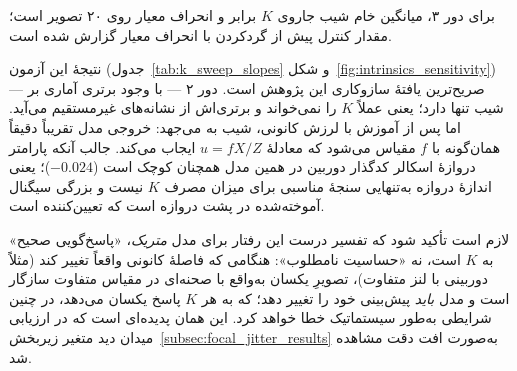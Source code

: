 برای دور ۳، میانگین خام شیب جاروی $K$ برابر  و انحراف معیار
 روی ۲۰ تصویر است؛ مقدار کنترل پیش از گردکردن
 با انحراف معیار  گزارش شده است.

نتیجهٔ این آزمون (جدول~\ref{tab:k_sweep_slopes} و شکل~\ref{fig:intrinsics_sensitivity}) صریح‌ترین یافتهٔ سازوکاری این پژوهش است. \proposedmodel{} دور ۲ --- با وجود برتری آماری بر \controlmodel{} --- شیب تنها  دارد؛ یعنی عملاً $K$ را نمی‌خواند و برتری‌اش از نشانه‌های غیرمستقیم می‌آید. اما پس از آموزش با لرزش کانونی، شیب به  می‌جهد: خروجی مدل تقریباً دقیقاً همان‌گونه با $f$ مقیاس می‌شود که معادلهٔ $u = f X / Z$ ایجاب می‌کند. جالب آنکه پارامتر دروازهٔ اسکالر کدگذار دوربین در همین مدل همچنان کوچک است ($-0.024$)؛ یعنی اندازهٔ دروازه به‌تنهایی سنجهٔ مناسبی برای میزان مصرف $K$ نیست و بزرگی سیگنال آموخته‌شده در پشت دروازه است که تعیین‌کننده است.

لازم است تأکید شود که تفسیر درست این رفتار برای مدل \emph{متریک}، «پاسخ‌گویی صحیح» به $K$ است، نه «حساسیت نامطلوب»: هنگامی که فاصلهٔ کانونی واقعاً تغییر کند (مثلاً دوربینی با لنز متفاوت)، تصویرِ یکسان به‌واقع با صحنه‌ای در مقیاس متفاوت سازگار است و مدل \emph{باید} پیش‌بینی خود را تغییر دهد؛ \controlmodel{} که به هر $K$ پاسخ یکسان می‌دهد، در چنین شرایطی به‌طور سیستماتیک خطا خواهد کرد. این همان پدیده‌ای است که در ارزیابی میدان دید متغیر زیربخش~\ref{subsec:focal_jitter_results} به‌صورت افت دقت \controlmodel{} مشاهده شد.

